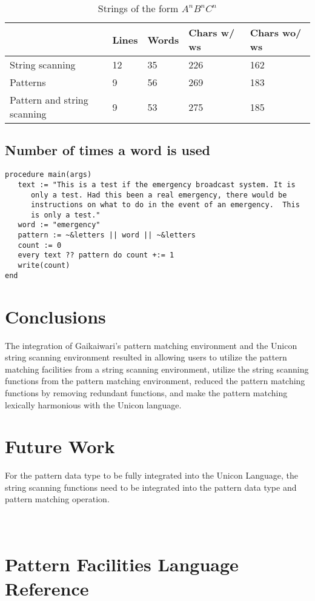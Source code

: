 \documentclass{article}
\begin{document}
\begin{table}[ht]
	\caption{Strings of the form \emph{$A^nB^nC^n$}}
	\centering
	\begin{tabular}{|l|l|l|l|l|}
		\hline\hline
		 & Lines & Words & Chars w/ ws & Chars wo/ ws\\
		\hline
		String scanning & 12 & 35 & 226 & 162 \\
		Patterns & 9 & 56 & 269 & 183 \\
		Pattern and string scanning & 9 & 53 & 275 & 185 \\
		\hline
	\end{tabular}
\end{table}

\subsection{Number of times a word is used}

\begin{verbatim}
procedure main(args)
   text := "This is a test if the emergency broadcast system. It is 
      only a test. Had this been a real emergency, there would be
      instructions on what to do in the event of an emergency.  This 
      is only a test."
   word := "emergency"
   pattern := ~&letters || word || ~&letters
   count := 0
   every text ?? pattern do count +:= 1
   write(count)
end
\end{verbatim}

\section{Conclusions}
The integration of Gaikaiwari's pattern matching environment and the Unicon string scanning environment resulted in allowing users to utilize the pattern matching facilities from a string scanning environment, utilize the string scanning functions from the pattern matching environment, reduced the pattern matching functions by removing redundant functions, and make the pattern matching lexically harmonious with the Unicon language.

\section{Future Work}
For the pattern data type to be fully integrated into the Unicon Language, the string scanning functions need to be integrated into the pattern data type and pattern matching operation.  

\newpage
\appendix
\section{\\Pattern Facilities Language Reference} \label{App:AppendixA}
\end{document}
